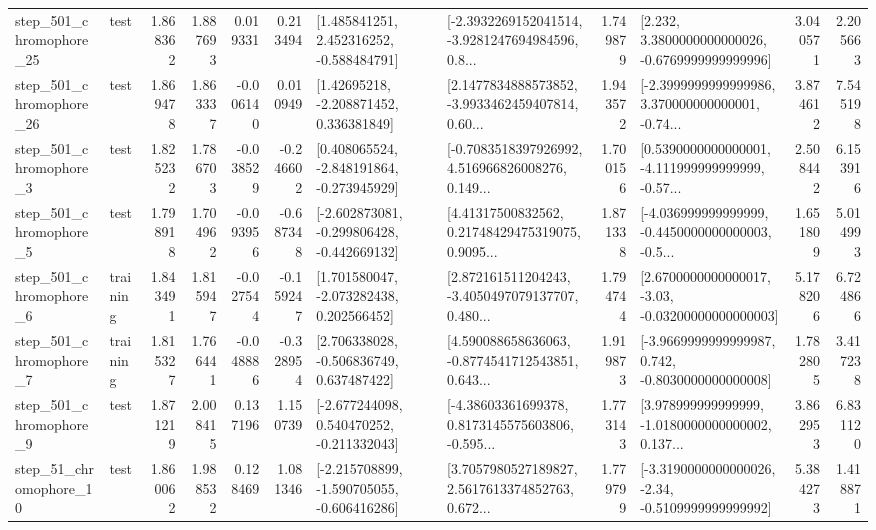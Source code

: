 \begin{tabular}{llrrrrllrlrr}
  step\_501\_chromophore\_25 &      test &      1.868362 &    1.887693 &      0.019331 &  0.213494 &    [1.485841251, 2.452316252, -0.588484791] &  [-2.3932269152041514, -3.9281247694984596, 0.8... &       1.749879 &   [2.232, 3.3800000000000026, -0.6769999999999996] &            3.040571 &          2.205663 \\
  step\_501\_chromophore\_26 &      test &      1.869478 &    1.863337 &     -0.006140 &  0.010949 &     [1.42695218, -2.208871452, 0.336381849] &  [2.1477834888573852, -3.9933462459407814, 0.60... &       1.943572 &  [-2.3999999999999986, 3.370000000000001, -0.74... &            3.874612 &          7.545198 \\
   step\_501\_chromophore\_3 &      test &      1.825232 &    1.786703 &     -0.038529 & -0.246602 &   [0.408065524, -2.848191864, -0.273945929] &  [-0.7083518397926992, 4.516966826008276, 0.149... &       1.700156 &  [0.5390000000000001, -4.111999999999999, -0.57... &            2.508442 &          6.153916 \\
   step\_501\_chromophore\_5 &      test &      1.798918 &    1.704962 &     -0.093956 & -0.687348 &  [-2.602873081, -0.299806428, -0.442669132] &  [4.41317500832562, 0.21748429475319075, 0.9095... &       1.871338 &  [-4.036999999999999, -0.4450000000000003, -0.5... &            1.651809 &          5.014993 \\
   step\_501\_chromophore\_6 &  training &      1.843491 &    1.815947 &     -0.027544 & -0.159247 &    [1.701580047, -2.073282438, 0.202566452] &  [2.872161511204243, -3.4050497079137707, 0.480... &       1.794744 &  [2.6700000000000017, -3.03, -0.03200000000000003] &            5.178206 &          6.724866 \\
   step\_501\_chromophore\_7 &  training &      1.815327 &    1.766441 &     -0.048886 & -0.328954 &    [2.706338028, -0.506836749, 0.637487422] &  [4.590088658636063, -0.8774541712543851, 0.643... &       1.919873 &  [-3.9669999999999987, 0.742, -0.8030000000000008] &            1.782805 &          3.417238 \\
   step\_501\_chromophore\_9 &      test &      1.871219 &    2.008415 &      0.137196 &  1.150739 &   [-2.677244098, 0.540470252, -0.211332043] &  [-4.38603361699378, 0.8173145575603806, -0.595... &       1.773143 &  [3.978999999999999, -1.0180000000000002, 0.137... &            3.862953 &          6.831120 \\
   step\_51\_chromophore\_10 &      test &      1.860062 &    1.988532 &      0.128469 &  1.081346 &  [-2.215708899, -1.590705055, -0.606416286] &  [3.7057980527189827, 2.5617613374852763, 0.672... &       1.779799 &  [-3.3190000000000026, -2.34, -0.5109999999999992] &            5.384273 &          1.418871 \\

\end{tabular}
